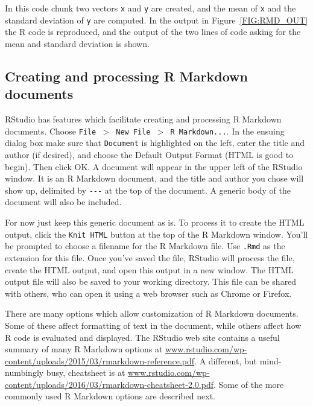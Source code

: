 \documentclass[12pt,oneside]{book}\usepackage[]{graphicx}\usepackage[]{color}
\begin{document}
In this code chunk two vectors \verb+x+ and \verb+y+ are created, and the mean  of \verb+x+ and the standard deviation of \verb+y+ are computed. In the output in Figure~\ref{FIG:RMD_OUT} the R code is reproduced, and the output of the two lines of code asking for the mean and standard deviation is shown.

\subsection{Creating and processing R Markdown documents}
RStudio has features which facilitate creating and processing R Markdown documents. Choose \texttt{File $>$ New File $>$ R  Markdown...}. In the ensuing dialog box make sure that \verb+Document+ is highlighted on the left, enter the title and author (if desired), and choose the Default Output Format (HTML is good to begin). Then click OK. A document will appear in the upper left of the RStudio window. It is an R Markdown document, and the title and author you chose will show up, delimited by \verb+---+ at the top of the document. A generic body of the document will also be included. 

For now just keep this generic document as is. To process it to create the HTML output, click the \verb+Knit HTML+ button at the top of the R Markdown window. You'll be prompted to choose a filename for the R Markdown file. Use \verb+.Rmd+ as the extension for this file. Once you've saved the file, RStudio will process the file, create the HTML output, and open this output in a new window. The HTML output file will also be saved to your working directory. This file can be shared with others, who can open it using a web browser such as Chrome or Firefox. 

There are many options which allow customization of R Markdown documents. Some of these affect formatting of text in the document, while others affect how R code is evaluated and displayed. The RStudio web site contains a useful summary of many R Markdown options at \url{www.rstudio.com/wp-content/uploads/2015/03/rmarkdown-reference.pdf}. A different, but mind-numbingly busy, cheatsheet is at \url{www.rstudio.com/wp-content/uploads/2016/03/rmarkdown-cheatsheet-2.0.pdf}. Some of the more commonly used R Markdown options are described next.
\end{document}
